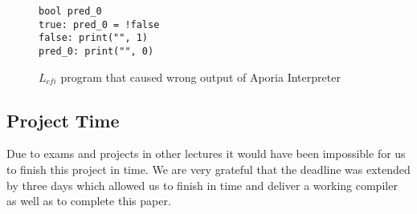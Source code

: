\begin{figure}[h!]
	\begin{lstlisting}
bool pred_0
true: pred_0 = !false
false: print("", 1)
pred_0: print("", 0) 
	\end{lstlisting}
	\caption{$L_{cfi}$ program that caused wrong output of Aporia Interpreter}
	\label{code:aporia_issue}
\end{figure}

\subsection{Project Time}
Due to exams and projects in other lectures it would have been impossible for us to finish this project in time. We are very grateful that the deadline was extended by three days which allowed us to finish in time and deliver a working compiler as well as to complete this paper.
